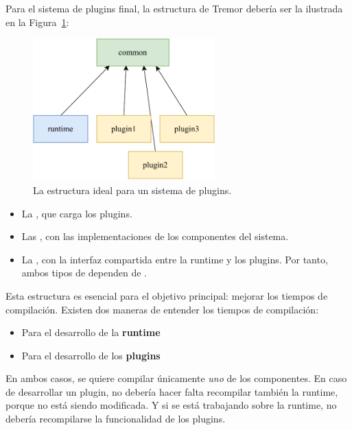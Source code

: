 Para el sistema de plugins final, la estructura de Tremor debería ser la
ilustrada en la Figura~\ref{fig:separation}:

\begin{figure}
    \centering
    \includegraphics[width=7cm]{./Imagenes/separation.pdf}
    \caption{La estructura ideal para un sistema de plugins.}%
    \label{fig:separation}
\end{figure}

\begin{itemize}
    \item La \crate {}, que carga los plugins.

    \item Las \crates {}, con las implementaciones de los componentes
        del sistema.

    \item La \crate {}, con la interfaz compartida entre la runtime y
        los plugins. Por tanto, ambos tipos de \crate dependen de .

\end{itemize}

Esta estructura es esencial para el objetivo principal: mejorar los tiempos de
compilación. Existen dos maneras de entender los tiempos de compilación:

\begin{itemize}
    \item Para el desarrollo de la \textbf{runtime}

    \item Para el desarrollo de los \textbf{plugins}

\end{itemize}

En ambos casos, se quiere compilar únicamente \emph{uno} de los componentes. En
caso de desarrollar un plugin, no debería hacer falta recompilar también la
runtime, porque no está siendo modificada. Y si se está trabajando sobre la
runtime, no debería recompilarse la funcionalidad de los plugins.

